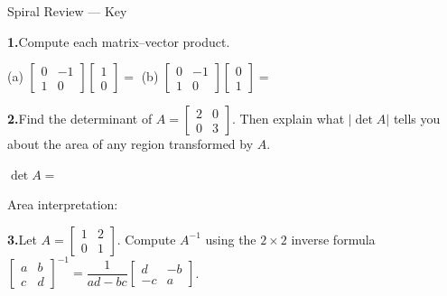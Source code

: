 \documentclass[10pt]{article}
\begin{document}
\namedateperiod

\vspace{0.12in}

\begin{notesbox}{Spiral Review --- Key}
\small

\textbf{1.}\quad Compute each matrix--vector product.

\vspace{0.06in}
\hspace{1em}
(a)\quad
$\begin{bmatrix}0 & -1 \\ 1 & 0\end{bmatrix}
\begin{bmatrix}1 \\ 0\end{bmatrix}
= $ 
\qquad\qquad
(b)\quad
$\begin{bmatrix}0 & -1 \\ 1 & 0\end{bmatrix}
\begin{bmatrix}0 \\ 1\end{bmatrix}
= $ 

\vspace{0.2in}

\textbf{2.}\quad Find the determinant of $A = \begin{bmatrix}2 & 0 \\ 0 & 3\end{bmatrix}$.
Then explain what $|\det A|$ tells you about the area of any region transformed by $A$.

\vspace{0.06in}
\hspace{1em} $\det A = $ 

\vspace{0.06in}
\hspace{1em} Area interpretation: 

\vspace{0.2in}

\textbf{3.}\quad Let $A = \begin{bmatrix}1 & 2 \\ 0 & 1\end{bmatrix}$.
Compute $A^{-1}$ using the $2\times2$ inverse formula
$\begin{bmatrix}a&b\\c&d\end{bmatrix}^{-1}=\dfrac{1}{ad-bc}\begin{bmatrix}d&-b\\-c&a\end{bmatrix}$.


\end{notesbox}
\end{document}
